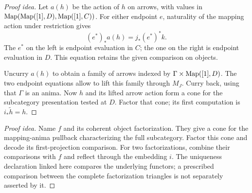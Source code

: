 \documentclass[11pt]{article}
\begin{document}
\begin{proof}[Proof idea]
Let $a(h)$ be the action of $h$ on arrows, with values in
$\operatorname{Map}(\operatorname{Map}([1],D),\operatorname{Map}([1],C))$.
For either endpoint $e$, naturality of the mapping action under restriction
gives
\[
 (e^*)_*a(h)=j_*(e^*)^*k.
\]
The $e^*$ on the left is endpoint evaluation in $C$; the one on the right
is endpoint evaluation in $D$. This equation retains the given
comparison on objects.

Uncurry $a(h)$ to obtain a family of arrows indexed by
$\Gamma\times\operatorname{Map}([1],D)$. The two endpoint equations allow
 to lift this family through
$M_J$. Curry back, using that $\Gamma$ is an anima. Now $h$ and its
lifted arrow action form a cone for the subcategory presentation tested
at $D$. Factor that cone; its first computation is $i_*\widetilde h=h$.
\end{proof}

\begin{proof}[Proof idea]
Name $f$ and its coherent object factorization. They give a cone for the
mapping-anima pullback characterizing the full subcategory. Factor this
cone and decode its first-projection comparison. For two factorizations,
combine their comparisons with $f$ and reflect through the embedding $i$.
The uniqueness declaration linked here compares the underlying functors;
a prescribed comparison between the complete factorization triangles is
not separately asserted by it.
\end{proof}
\end{document}
